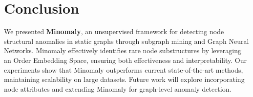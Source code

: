 \documentclass[pdflatex,sn-mathphys-num]{sn-jnl}%
\theoremstyle{thmstyleone}%
\theoremstyle{thmstyletwo}%
\theoremstyle{thmstylethree}%
\begin{document}
\vspace*{-25pt}
\section{Conclusion}
\label{sec:conclusion}
We presented \textbf{Minomaly}, an unsupervised framework for detecting node structural anomalies in static graphs through subgraph mining and Graph Neural Networks. Minomaly effectively identifies rare node substructures by leveraging an Order Embedding Space, ensuring both effectiveness and interpretability. Our experiments show that Minomaly outperforms current state-of-the-art methods, maintaining scalability on large datasets. Future work will explore incorporating node attributes and extending Minomaly for graph-level anomaly detection.
\end{document}
